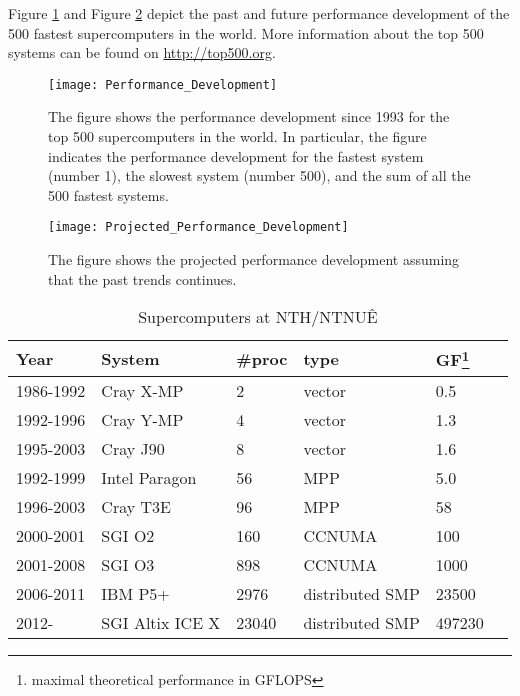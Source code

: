 Figure \ref{fig:perform_dev} and Figure \ref{fig:proj_perform_dev} depict the
past and future performance development of the 500 fastest supercomputers in the
world. More information about the top 500 systems can be found on
\url{http://top500.org}.

\vspace{2cm}
\begin{figure}[!ht]
  \centering
  \texttt{[image: Performance\_Development]}
  \caption{
    The figure shows the performance development since 1993 for the top 500
    supercomputers in the world. In particular, the figure indicates the
    performance development for the fastest system (number 1), the slowest
    system (number 500), and the sum of all the 500 fastest systems.
  }
  \label{fig:perform_dev}
\end{figure}
\vspace{1cm}

\begin{figure}[!ht]
  \centering
  \texttt{[image: Projected\_Performance\_Development]}
  \caption{
    The figure shows the projected performance development assuming that the
    past trends continues.
  }
  \label{fig:proj_perform_dev}
\end{figure}

\begin{table}
  \caption{Supercomputers at NTH/NTNUÊ}
  \centering
  \begin{tabular}{|l|l|l|l|l|l|}
    \hline
    Year & System & \#proc & type & GF\footnote{maximal theoretical performance in GFLOPS} \\
    \hline
    1986-1992 & Cray X-MP & 2 & vector & 0.5 \\
    1992-1996 & Cray Y-MP & 4 & vector & 1.3\\
    1995-2003 & Cray J90     & 8 & vector & 1.6 \\
    1992-1999 & Intel Paragon & 56 & MPP & 5.0\\
    1996-2003 & Cray T3E & 96 & MPP & 58\\
    2000-2001 & SGI O2 & 160 & CCNUMA & 100\\
    2001-2008 & SGI O3 & 898 & CCNUMA & 1000\\
    2006-2011 & IBM P5+ & 2976 & distributed SMP & 23500\\
    2012-     & SGI Altix ICE X & 23040 & distributed SMP & 497230 \\
    \hline
  \end{tabular}
  \label{tab:history_ntnu}
\end{table}

